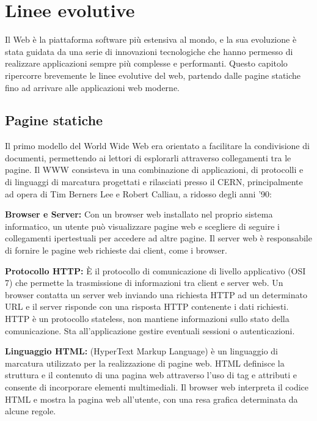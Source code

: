 \section{Linee evolutive}\label{linee-evolutive}

Il Web è la piattaforma software più estensiva al mondo, e la sua
evoluzione è stata guidata da una serie di innovazioni tecnologiche che
hanno permesso di realizzare applicazioni sempre più complesse e
performanti. Questo capitolo ripercorre brevemente le linee evolutive
del web, partendo dalle pagine statiche fino ad arrivare alle
applicazioni web moderne.

\subsection{Pagine statiche}\label{pagine-statiche}

Il primo modello del World Wide Web era orientato a facilitare la
condivisione di documenti, permettendo ai lettori di esplorarli
attraverso collegamenti tra le pagine. Il WWW consisteva in una
combinazione di applicazioni, di protocolli e di linguaggi di marcatura
progettati e rilasciati presso il CERN, principalmente ad opera di Tim
Berners Lee e Robert Calliau, a ridosso degli anni '90:

\textbf{Browser e Server:} Con un browser web installato nel proprio
sistema informatico, un utente può visualizzare pagine web e scegliere
di seguire i collegamenti ipertestuali per accedere ad altre pagine. Il
server web è responsabile di fornire le pagine web richieste dai client,
come i browser.

\textbf{Protocollo HTTP:} È il protocollo di comunicazione di livello
applicativo (OSI 7) che permette la trasmissione di informazioni tra
client e server web. Un browser contatta un server web inviando una
richiesta HTTP ad un determinato URL e il server risponde con una
risposta HTTP contenente i dati richiesti. HTTP è un protocollo
stateless, non mantiene informazioni sullo stato della comunicazione.
Sta all'applicazione gestire eventuali sessioni o autenticazioni.

\textbf{Linguaggio HTML:} (HyperText Markup Language) è un linguaggio di
marcatura utilizzato per la realizzazione di pagine web. HTML definisce
la struttura e il contenuto di una pagina web attraverso l'uso di tag e
attributi e consente di incorporare elementi multimediali. Il browser
web interpreta il codice HTML e mostra la pagina web all'utente, con una
resa grafica determinata da alcune regole.

